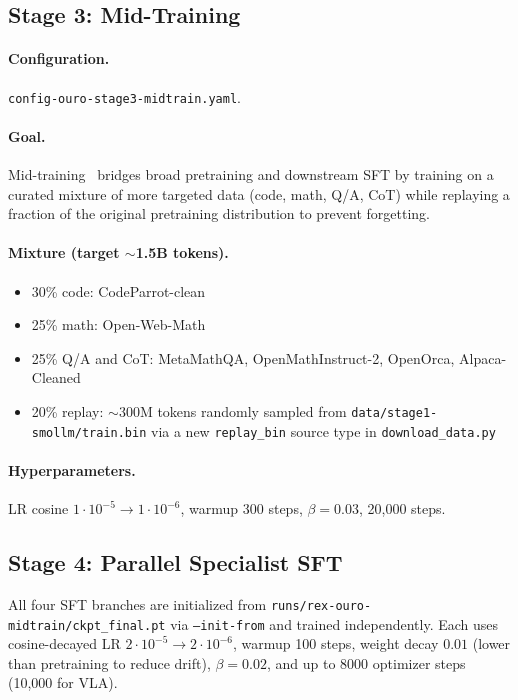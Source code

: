 \documentclass[11pt,a4paper]{article}
\begin{document}
\subsection{Stage 3: Mid-Training}

\paragraph{Configuration.}
\texttt{config-ouro-stage3-midtrain.yaml}.

\paragraph{Goal.}
Mid-training~\cite{midtrain2025,springer-midtrain} bridges broad pretraining
and downstream SFT by training on a curated mixture of more targeted data
(code, math, Q/A, CoT) while replaying a fraction of the original
pretraining distribution to prevent forgetting.

\paragraph{Mixture (target $\sim$1.5B tokens).}
\begin{itemize}[noitemsep,leftmargin=*]
  \item 30\% code: CodeParrot-clean
  \item 25\% math: Open-Web-Math
  \item 25\% Q/A and CoT: MetaMathQA, OpenMathInstruct-2, OpenOrca, Alpaca-Cleaned
  \item 20\% replay: $\sim$300M tokens randomly sampled from
    \texttt{data/stage1-smollm/train.bin} via a new
    \texttt{replay\_bin} source type in \texttt{download\_data.py}
\end{itemize}

\paragraph{Hyperparameters.}
LR cosine $1 \cdot 10^{-5} \to 1 \cdot 10^{-6}$, warmup 300 steps, $\beta = 0.03$, 20{,}000 steps.

\subsection{Stage 4: Parallel Specialist SFT}

All four SFT branches are initialized from
\texttt{runs/rex-ouro-midtrain/ckpt\_final.pt} via \texttt{--init-from} and
trained independently. Each uses cosine-decayed LR
$2 \cdot 10^{-5} \to 2 \cdot 10^{-6}$, warmup 100 steps, weight decay $0.01$
(lower than pretraining to reduce drift), $\beta = 0.02$, and up to 8000
optimizer steps (10{,}000 for VLA).
\end{document}
